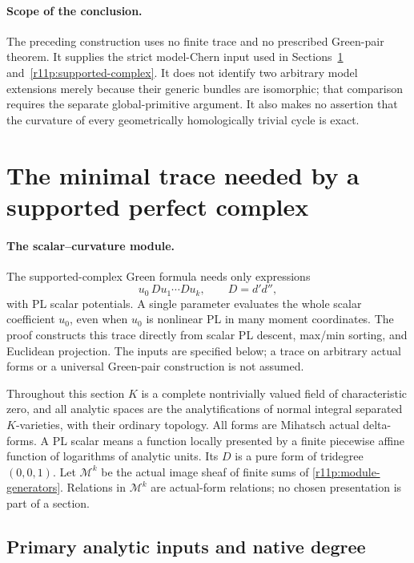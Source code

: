 \documentclass[11pt,a4paper]{article}
\theoremstyle{definition}
\theoremstyle{remark}
\begin{document}
\paragraph*{Scope of the conclusion.}
The preceding construction uses no finite trace and no prescribed
Green-pair theorem.  It supplies the strict model-Chern input used in
Sections~\ref{r11p:minimal-trace} and~\ref{r11p:supported-complex}.  It does not identify two arbitrary model extensions merely
because their generic bundles are isomorphic; that comparison requires
the separate global-primitive argument.  It also makes no assertion
that the curvature of every geometrically homologically trivial
cycle is exact.


\section{The minimal trace needed by a supported perfect complex}
\label{r11p:minimal-trace}

\paragraph*{The scalar--curvature module.}
The supported-complex Green formula needs only expressions
\[
                       u_0\,Du_1\cdots Du_k, \qquad D=d'd'',
\tag{MT1}\label{r11p:module-generators}
\]
with PL scalar potentials. A single parameter evaluates the whole
scalar coefficient $u_0$, even when $u_0$ is nonlinear PL in many moment
coordinates. The proof constructs this trace directly from scalar PL
descent, max/min sorting, and Euclidean projection. The inputs are
specified below; a trace on arbitrary actual forms or a universal
Green-pair construction is not assumed.

Throughout this section $K$ is a complete nontrivially valued field of
characteristic zero, and all analytic spaces are the analytifications of
normal integral separated $K$-varieties, with their ordinary topology.
All forms are Mihatsch actual delta-forms.  A PL scalar means a function
locally presented by a finite piecewise affine function of logarithms of
analytic units.  Its $D$ is a pure form of tridegree $(0,0,1)$.
Let $\mathscr M^k$ be the actual image sheaf of finite sums of
\eqref{r11p:module-generators}.  Relations in $\mathscr M^k$ are actual-form
relations; no chosen presentation is part of a section.

\subsection{Primary analytic inputs and native degree}
\end{document}
